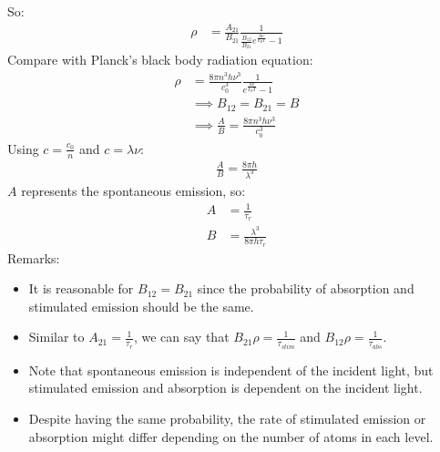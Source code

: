 \documentclass[11pt]{article}
\begin{document}
So:
\begin{align*}
    \rho &= \frac{A_{21}}{B_{21}} \frac{1}{\frac{B_{12}}{B_{21}} e^{\frac{h\nu}{k_BT}} - 1} 
\end{align*}
Compare with Planck's black body radiation equation:
\begin{align*}
    \rho &= \frac{8\pi n^3 h\nu^3}{c_0^3} \frac{1}{e^{\frac{h\nu}{k_BT}} - 1} \\
    &\implies B_{12} = B_{21} = B \\
    &\implies \frac{A}{B} = \frac{8\pi n^3 h\nu^3}{c_0^3}
\end{align*}
Using $c = \frac{c_0}{n}$ and $c = \lambda \nu$:
\begin{align*}
    \frac{A}{B} = \frac{8 \pi h}{\lambda^3}
\end{align*}
$A$ represents the spontaneous emission, so:
\begin{align*}
    A &= \frac{1}{\tau_r} \\
    B &= \frac{\lambda^3}{8\pi h \tau_r}
\end{align*}
Remarks:
\begin{itemize}
    \item It is reasonable for $B_{12} = B_{21}$ since the probability of absorption and stimulated emission should be the same.
    \item Similar to $A_{21} = \frac{1}{\tau_r}$, we can say that $B_{21} \rho = \frac{1}{\tau_{stim}}$ and $B_{12} \rho = \frac{1}{\tau_{abs}}$.
    \item Note that spontaneous emission is independent of the incident light, but stimulated emission and absorption is dependent on the incident light.
    \item Despite having the same probability, the rate of stimulated emission or absorption might differ depending on the number of atoms in each level.
\end{itemize}
\end{document}
